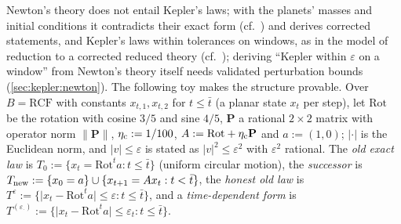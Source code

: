 Newton's theory does not entail Kepler's laws; with the planets' masses and initial conditions it contradicts their exact form (cf.\ \citealp{duhem1954aim}) and derives corrected statements, and Kepler's laws within tolerances on windows, as in the model of reduction to a corrected reduced theory (cf.\ \citealp{schaffner1967approaches}); deriving ``Kepler within $\varepsilon$ on a window'' from Newton's theory itself needs validated perturbation bounds (\cref{sec:kepler:newton}). The following toy makes the structure provable. Over $B=\mathrm{RCF}$ with constants $x_{t,1},x_{t,2}$ for $t\le\bar t$ (a planar state $x_t$ per step), let $\mathrm{Rot}$ be the rotation with cosine $3/5$ and sine $4/5$, $\mathbf P$ a rational $2\times2$ matrix with operator norm $\lVert\mathbf P\rVert$, $\eta_{\rm c}:=1/100$, $A:=\mathrm{Rot}+\eta_{\rm c}\mathbf P$ and $a:=(1,0)$; $\lvert\cdot\rvert$ is the Euclidean norm, and $\lvert v\rvert\le\varepsilon$ is stated as $\lvert v\rvert^2\le\varepsilon^2$ with $\varepsilon^2$ rational. The \emph{old exact law} is $T_0:=\{x_t=\mathrm{Rot}^ta:t\le\bar t\}$ (uniform circular motion), the \emph{successor} is $T_{\rm new}:=\{x_0=a\}\cup\{x_{t+1}=Ax_t:t<\bar t\}$, the \emph{honest old law} is $T^\varepsilon:=\{\lvert x_t-\mathrm{Rot}^ta\rvert\le\varepsilon:t\le\bar t\}$, and a \emph{time-dependent form} is $T^{(\varepsilon_\cdot)}:=\{\lvert x_t-\mathrm{Rot}^ta\rvert\le\varepsilon_t:t\le\bar t\}$.

